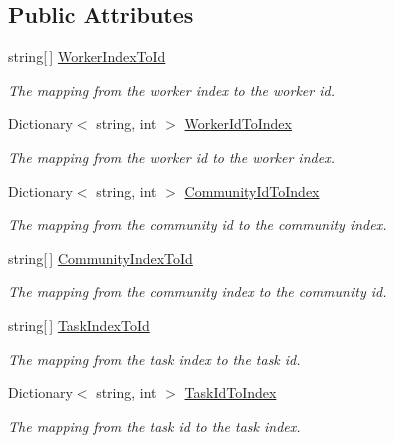 \subsection*{Public Attributes}
\begin{DoxyCompactItemize}
\item 
string\mbox{[}$\,$\mbox{]} \hyperlink{class_crowdsourcing_models_1_1_data_mapping_a37f768a9661a8d4156f10b747cd0dec0}{Worker\+Index\+To\+Id}
\begin{DoxyCompactList}\small\item\em The mapping from the worker index to the worker id. \end{DoxyCompactList}\item 
Dictionary$<$ string, int $>$ \hyperlink{class_crowdsourcing_models_1_1_data_mapping_a6c36a93683e83c27e0885ddd1df0fbc2}{Worker\+Id\+To\+Index}
\begin{DoxyCompactList}\small\item\em The mapping from the worker id to the worker index. \end{DoxyCompactList}\item 
Dictionary$<$ string, int $>$ \hyperlink{class_crowdsourcing_models_1_1_data_mapping_a60781898e954ab8137d6ef1e6546419a}{Community\+Id\+To\+Index}
\begin{DoxyCompactList}\small\item\em The mapping from the community id to the community index. \end{DoxyCompactList}\item 
string\mbox{[}$\,$\mbox{]} \hyperlink{class_crowdsourcing_models_1_1_data_mapping_af1db5e9d061b76544cca10847079b102}{Community\+Index\+To\+Id}
\begin{DoxyCompactList}\small\item\em The mapping from the community index to the community id. \end{DoxyCompactList}\item 
string\mbox{[}$\,$\mbox{]} \hyperlink{class_crowdsourcing_models_1_1_data_mapping_ae4da6289f06e9d087ce8b3c7458308ba}{Task\+Index\+To\+Id}
\begin{DoxyCompactList}\small\item\em The mapping from the task index to the task id. \end{DoxyCompactList}\item 
Dictionary$<$ string, int $>$ \hyperlink{class_crowdsourcing_models_1_1_data_mapping_a1c4dfca839294c04a199fd9b87c51866}{Task\+Id\+To\+Index}
\begin{DoxyCompactList}\small\item\em The mapping from the task id to the task index. \end{DoxyCompactList}\item 

\end{DoxyCompactItemize}
